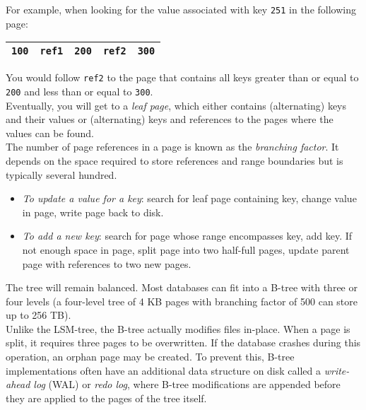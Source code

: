 \documentclass[12pt, titlepage]{article}
\begin{document}
For example, when looking for the value associated with key \texttt{251} in the following page:

\begin{table}[H]
    \centering
    \begin{tabular}{|c|c|c|c|c|}
        \hline
        \texttt{100} & \texttt{ref1} & \texttt{200} & \texttt{ref2} & \texttt{300} \\
        \hline
    \end{tabular}
\end{table}

You would follow \texttt{ref2} to the page that contains all keys greater than or equal to \texttt{200} and less than or equal to \texttt{300}. \\

Eventually, you will get to a \textit{leaf page}, which either contains (alternating) keys and their values or (alternating) keys and references to the pages where the values can be found. \\

The number of page references in a page is known as the \textit{branching factor}. It depends on the space required to store references and range boundaries but is typically several hundred.

\begin{itemize}
    \item \textit{To update a value for a key}: search for leaf page containing key, change value in page, write page back to disk.
    \item \textit{To add a new key}: search for page whose range encompasses key, add key. If not enough space in page, split page into two half-full pages, update parent page with references to two new pages.
\end{itemize}

The tree will remain balanced. Most databases can fit into a B-tree with three or four levels (a four-level tree of 4 KB pages with branching factor of 500 can store up to 256 TB). \\

Unlike the LSM-tree, the B-tree actually modifies files in-place. When a page is split, it requires three pages to be overwritten. If the database crashes during this operation, an orphan page may be created. To prevent this, B-tree implementations often have an additional data structure on disk called a \textit{write-ahead log} (WAL) or \textit{redo log}, where B-tree modifications are appended before they are applied to the pages of the tree itself. \\
\end{document}

